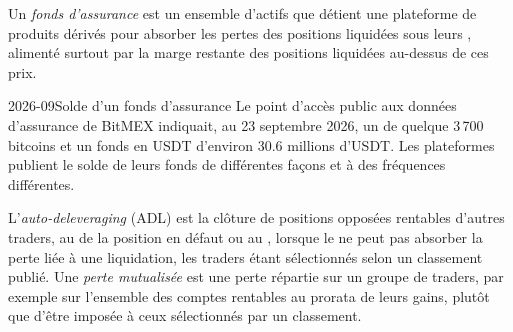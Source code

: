 \begin{definition}\label{def:m3:margin-liquidation-and-loss-allocation:fund}
Un \emph{fonds d'assurance} est un ensemble d'actifs que détient une plateforme de produits dérivés pour absorber les pertes
des positions liquidées sous leurs , alimenté surtout par la marge restante des positions
liquidées au-dessus de ces prix.
\end{definition}

\begin{dated}{2026-09}{Solde d'un fonds d'assurance}\label{dat:m3:margin-liquidation-and-loss-allocation:fund}
Le point d'accès public aux données d'assurance de BitMEX indiquait, au 23 septembre 2026, un  de quelque 3\,700
bitcoins et un fonds en USDT d'environ 30.6 millions d'USDT. Les plateformes publient le solde de leurs fonds de différentes façons et à des
fréquences différentes.
\end{dated}

\begin{definition}\label{def:m3:margin-liquidation-and-loss-allocation:adl}
L'\emph{auto-deleveraging} (ADL) est la clôture de positions opposées rentables d'autres traders,
au  de la position en défaut ou au , lorsque le  ne peut pas absorber la perte liée à une
liquidation, les traders étant sélectionnés selon un classement publié. Une \emph{perte mutualisée} est une
perte répartie sur un groupe de traders, par exemple sur l'ensemble des comptes rentables au prorata de leurs gains, plutôt que
d'être imposée à ceux sélectionnés par un classement.
\end{definition}

